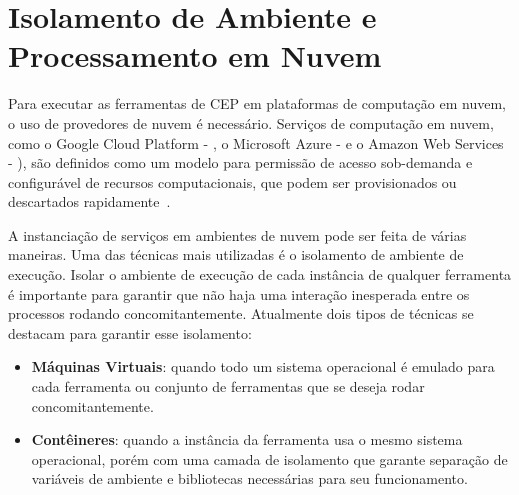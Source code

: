 \section{Isolamento de Ambiente e Processamento em Nuvem}
\label{sec:cloudtools}

Para executar as ferramentas de CEP em plataformas de computação em nuvem, o uso de provedores de nuvem é necessário. Serviços de computação em nuvem, como o Google Cloud Platform - \cite{GCP}, o Microsoft Azure - \cite{Azure} e o Amazon Web Services - \cite{AWS}), são definidos como um modelo para permissão de acesso sob-demanda e configurável de recursos computacionais, que podem ser provisionados ou descartados rapidamente~\citep{CLoudComputing}. 











A instanciação de serviços em ambientes de nuvem pode ser feita de várias maneiras. Uma das técnicas mais utilizadas é o isolamento de ambiente de execução. Isolar o ambiente de execução de cada instância de qualquer ferramenta é importante para garantir que não haja uma interação inesperada entre os processos rodando concomitantemente.
Atualmente dois tipos de técnicas se destacam para garantir esse isolamento:
\begin{itemize}
    \item \textbf{Máquinas Virtuais}: quando todo um sistema operacional é emulado para cada ferramenta ou conjunto de ferramentas que se deseja rodar concomitantemente. 
    \item \textbf{Contêineres}: quando a instância da ferramenta usa o mesmo sistema operacional, porém com uma camada de isolamento que garante separação de variáveis de ambiente e bibliotecas necessárias para seu funcionamento.
\end{itemize}

